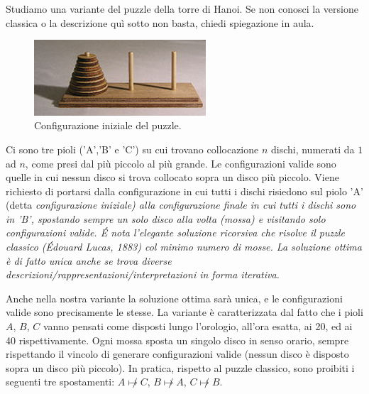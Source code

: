 \renewcommand{\nomebreve}{hanoi\_equal\_disks}
\renewcommand{\titolo}{The Hanoi puzzle with only clockwise moves}

\introduzione{}

Studiamo una variante del puzzle della torre di Hanoi. Se non conosci la versione classica o la descrizione quì sotto non basta, chiedi spiegazione in aula.

\begin{figure}[h!]
\begin{center}
  \noindent \includegraphics[width=0.57\textwidth]{figures/220px-Tower_of_Hanoi.jpeg}
\end{center}
\caption{Configurazione iniziale del puzzle.}
\end{figure}

Ci sono tre pioli ('A','B' e 'C') su cui trovano collocazione $n$ dischi, numerati da $1$ ad $n$, come presi dal più piccolo al più grande. Le configurazioni valide sono quelle in cui nessun disco si trova collocato sopra un disco più piccolo.
Viene richiesto di portarsi dalla configurazione in cui tutti i dischi risiedono sul piolo 'A' (detta \it{configurazione iniziale}) alla \it{configurazione finale} in cui tutti i dischi sono in 'B', spostando sempre un solo disco alla volta (mossa) e visitando solo configurazioni valide.
\'E nota l'elegante soluzione ricorsiva che risolve il puzzle classico (Édouard Lucas, 1883) col minimo numero di mosse. La soluzione ottima è di fatto unica anche se trova diverse descrizioni/rappresentazioni/interpretazioni in forma iterativa.

Anche nella nostra variante la soluzione ottima sarà unica, e le configurazioni valide sono precisamente le stesse. La variante è caratterizzata dal fatto che i pioli $A$, $B$, $C$ vanno pensati come disposti lungo l'orologio, all'ora esatta, ai 20, ed ai 40 rispettivamente.
Ogni mossa sposta un singolo disco in senso orario, sempre rispettando il vincolo di generare configurazioni valide (nessun disco è disposto sopra un disco più piccolo). In pratica, rispetto al puzzle classico, sono proibiti i seguenti tre spostamenti: $A\not \mapsto C$, $B\not \mapsto A$, $C\not \mapsto B$.\\

